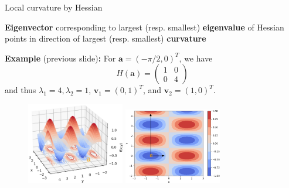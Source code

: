 \documentclass[11pt,compress,t,notes=noshow, xcolor=table]{beamer}
\begin{document}
\begin{vbframe}{Local curvature by Hessian}

\textbf{Eigenvector} corresponding to largest (resp. smallest) \textbf{eigenvalue} of Hessian points in direction of largest (resp. smallest) \textbf{curvature}

\lz

\textbf{Example} (previous slide)\textbf{:}
For $\bm{a}=(-\pi/2,0)^T$, we have
\begin{equation*}
    H(\bm{a}) = \begin{pmatrix}
        1 & 0 \\ 0 & 4
    \end{pmatrix}
\end{equation*}
and thus $\lambda_{1}=4, \lambda_{2}=1$, $\bm{v}_{1}=(0, 1)^T$, and $\bm{v}_{2}=(1, 0)^T$.

\begin{figure}
    \includegraphics[width=0.38\textwidth]{figure_man/hessian_3d.png}
    \hspace{0.5cm}
    \includegraphics[width=0.38\textwidth]{figure_man/hessian_contour.png}
\end{figure}

\end{vbframe}
\end{document}
